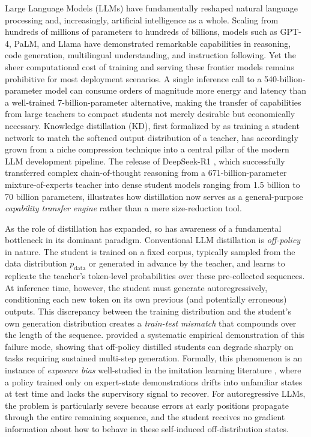 \documentclass{article} %
\newcommand{\pdata}{p_{\mathrm{data}}}
\begin{document}
Large Language Models (LLMs) have fundamentally reshaped natural language processing and, increasingly, artificial intelligence as a whole. Scaling from hundreds of millions of parameters to hundreds of billions, models such as GPT-4, PaLM, and Llama have demonstrated remarkable capabilities in reasoning, code generation, multilingual understanding, and instruction following. Yet the sheer computational cost of training and serving these frontier models remains prohibitive for most deployment scenarios. A single inference call to a 540-billion-parameter model can consume orders of magnitude more energy and latency than a well-trained 7-billion-parameter alternative, making the transfer of capabilities from large teachers to compact students not merely desirable but economically necessary. Knowledge distillation (KD), first formalized by \citet{hinton2015distilling} as training a student network to match the softened output distribution of a teacher, has accordingly grown from a niche compression technique into a central pillar of the modern LLM development pipeline. The release of DeepSeek-R1 \citep{2501.12948}, which successfully transferred complex chain-of-thought reasoning from a 671-billion-parameter mixture-of-experts teacher into dense student models ranging from 1.5 billion to 70 billion parameters, illustrates how distillation now serves as a general-purpose \textit{capability transfer engine} rather than a mere size-reduction tool.

As the role of distillation has expanded, so has awareness of a fundamental bottleneck in its dominant paradigm. Conventional LLM distillation is \textit{off-policy} in nature. The student is trained on a fixed corpus, typically sampled from the data distribution $\pdata$ or generated in advance by the teacher, and learns to replicate the teacher's token-level probabilities over these pre-collected sequences. At inference time, however, the student must generate autoregressively, conditioning each new token on its own previous (and potentially erroneous) outputs. This discrepancy between the training distribution and the student's own generation distribution creates a \textit{train-test mismatch} that compounds over the length of the sequence. \citet{2305.15717} provided a systematic empirical demonstration of this failure mode, showing that off-policy distilled students can degrade sharply on tasks requiring sustained multi-step generation. Formally, this phenomenon is an instance of \textit{exposure bias} well-studied in the imitation learning literature \citep{ross2011reduction}, where a policy trained only on expert-state demonstrations drifts into unfamiliar states at test time and lacks the supervisory signal to recover. For autoregressive LLMs, the problem is particularly severe because errors at early positions propagate through the entire remaining sequence, and the student receives no gradient information about how to behave in these self-induced off-distribution states.
\end{document}
